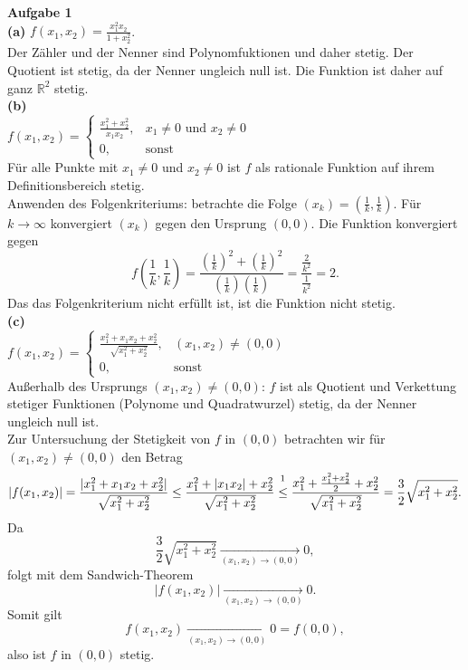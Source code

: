 \documentclass[a4paper,12pt]{article}
\begin{document}
\raggedright
\doublespacing
\noindent\textbf{Aufgabe 1} \\
\noindent\textbf{(a)} $f(x_1, x_2) = \frac{x_1^2 x_2}{1 + x_2^2}$. \\ Der Zähler und der Nenner sind Polynomfuktionen und daher stetig. Der Quotient ist stetig, da der Nenner ungleich null ist. Die Funktion ist daher auf ganz $\mathbb{R}^2$ stetig. \\
\bigskip
\noindent\textbf{(b)} \\ 
$f(x_1, x_2) = \begin{cases} \frac{x_1^2 + x_2^2}{x_1 x_2}, & x_1 \neq 0 \text{ und } x_2 \neq 0 \\ 0, & \text{sonst} \end{cases}$ \\
Für alle Punkte mit $x_1 \neq 0$ und $x_2 \neq 0$ ist $f$ als rationale Funktion auf ihrem Definitionsbereich stetig.\\
 Anwenden des Folgenkriteriums:  betrachte die Folge $(x_k) = (\frac{1}{k}, \frac{1}{k})$. Für $k \to \infty$ konvergiert $(x_k)$ gegen den Ursprung $(0,0)$. Die Funktion konvergiert gegen
 $$f \left(\frac{1}{k}, \frac{1}{k}\right) = \frac{(\frac{1}{k})^2 + (\frac{1}{k})^2}{(\frac{1}{k})(\frac{1}{k})} = \frac{\frac{2}{k^2}}{\frac{1}{k^2}} = 2.$$
Das das Folgenkriterium nicht erfüllt ist, ist die Funktion nicht stetig. \\
\bigskip
\noindent\textbf{(c)} \\
$f(x_1, x_2) = \begin{cases} \frac{x_1^2 + x_1 x_2 + x_2^2}{\sqrt{x_1^2 + x_2^2}}, & (x_1, x_2) \neq (0, 0) \\ 0, & \text{sonst} \end{cases}$ \\
Außerhalb des Ursprungs $(x_1, x_2) \neq (0,0)$: $f$ ist als Quotient und Verkettung stetiger Funktionen (Polynome und Quadratwurzel) stetig, da der Nenner ungleich null ist. \\
\renewcommand{\thefootnote}{\fnsymbol{footnote}} %
Zur Untersuchung der Stetigkeit von \(f\) in \((0,0)\) betrachten wir für \((x_1,x_2)\neq(0,0)\) den Betrag
\begin{equation*}
|f(x_1, x_2)|
= \frac{|x_1^2 + x_1x_2 + x_2^2|}{\sqrt{x_1^2 + x_2^2}}
\le \frac{x_1^2 + |x_1x_2| + x_2^2}{\sqrt{x_1^2 + x_2^2}}
\stackrel{\footnotemark}{\le}
\frac{x_1^2 + \frac{x_1^2 + x_2^2}{2} + x_2^2}{\sqrt{x_1^2 + x_2^2}}
= \frac{3}{2}\sqrt{x_1^2 + x_2^2}.
\end{equation*}
Da
\[
\frac{3}{2}\sqrt{x_1^2 + x_2^2} \xrightarrow[(x_1,x_2)\to(0,0)]{} 0,
\]
folgt mit dem Sandwich-Theorem
\[
|f(x_1,x_2)| \xrightarrow[(x_1,x_2)\to(0,0)]{} 0.
\]
Somit gilt
\[
f(x_1,x_2) \xrightarrow[(x_1,x_2)\to(0,0)]{} 0 = f(0,0),
\]
also ist \(f\) in \((0,0)\) stetig.

\end{document}
